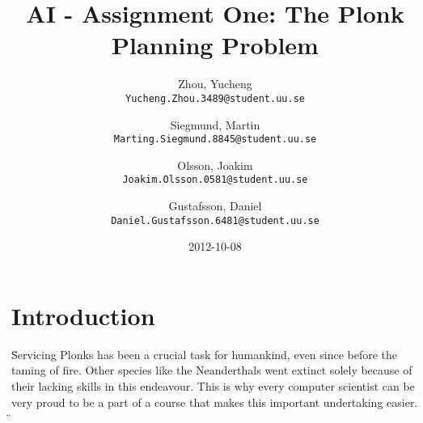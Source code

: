 \documentclass{article}
\begin{document}
\title{AI - Assignment One: The Plonk Planning Problem}
\date{2012-10-08}
\author{
	Zhou, Yucheng\\
	\texttt{Yucheng.Zhou.3489@student.uu.se}
	\and
	Siegmund, Martin\\
	\texttt{Marting.Siegmund.8845@student.uu.se}
	\and
	Olsson, Joakim\\
	\texttt{Joakim.Olsson.0581@student.uu.se}
	\and
	Gustafsson, Daniel\\
	\texttt{Daniel.Gustafsson.6481@student.uu.se}
}
\maketitle 

\section*{Introduction}
\" Servicing Plonks has been a crucial task for humankind, even since before the taming of fire. Other species like the Neanderthals went extinct solely because of their lacking skills in this endeavour. This is why every computer scientist can be very proud to be a part of a course that makes this important undertaking easier. \"
\end{document}
